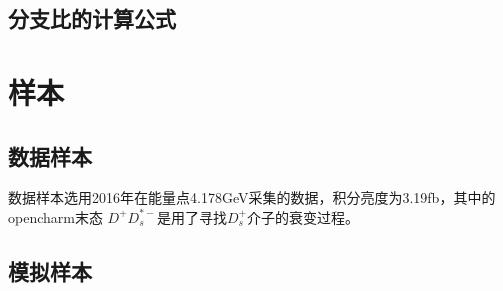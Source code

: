 \subsection{分支比的计算公式}

\section{样本}\label{sec:sample}
\subsection{数据样本}
数据样本选用2016年在能量点4.178GeV采集的数据，积分亮度为3.19fb，其中的opencharm末态
$D^{+}D_{s}^{*-}$是用了寻找$D_{s}^{+}$介子的衰变过程。

\subsection{模拟样本}
